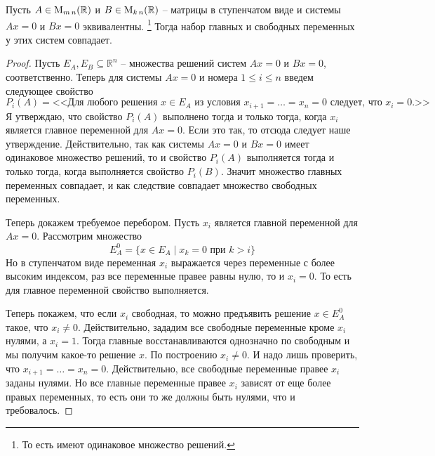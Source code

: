 \begin{claim}
Пусть $A\in\operatorname{M}_{m\,n}(\mathbb R)$ и $B\in\operatorname{M}_{k\,n}(\mathbb R)$ -- матрицы в ступенчатом виде и системы $Ax = 0$ и $Bx = 0$ эквивалентны.%
\footnote{То есть имеют одинаковое множество решений.}
Тогда набор главных и свободных переменных у этих систем совпадает.
\end{claim}
\begin{proof}

Пусть $E_A, E_B\subseteq \mathbb R^n$ -- множества решений систем $Ax = 0$ и $Bx = 0$, соответственно.
Теперь для системы $Ax = 0$ и номера $1\leqslant i \leqslant n$ введем следующее свойство 
\[
P_i(A) = \text{<<Для любого решения $x\in E_A$ из условия $x_{i+1} = \ldots = x_n = 0$ следует, что $x_i = 0$.>>}
\]
Я утверждаю, что свойство $P_i(A)$ выполнено тогда и только тогда, когда $x_i$ является главное переменной для $Ax = 0$.
Если это так, то отсюда следует наше утверждение.
Действительно, так как системы $Ax = 0$ и $Bx = 0$ имеет одинаковое множество решений, то и свойство $P_i(A)$ выполняется тогда и только тогда, когда выполняется свойство $P_i(B)$.
Значит множество главных переменных совпадает, и как следствие совпадает множество свободных переменных.

Теперь докажем требуемое перебором.
Пусть $x_i$ является главной переменной для $Ax = 0$.
Рассмотрим множество
\[
E_A^0 = \{x\in E_A\mid x_k = 0\text{ при }k>i\}
\]
Но в ступенчатом виде переменная $x_i$ выражается через переменные с более высоким индексом, раз все переменные правее равны нулю, то и $x_i = 0$.
То есть для главное переменной свойство выполняется.

Теперь покажем, что если $x_i$ свободная, то можно предъявить решение $x\in E_A^0$ такое, что $ x_i \neq 0$.
Действительно, зададим все свободные переменные кроме $x_i$ нулями, а $x_i = 1$.
Тогда главные восстанавливаются однозначно по свободным и мы получим какое-то решение $x$.
По построению $x_i\neq 0$.
И надо лишь проверить, что $x_{i+1} = \ldots = x_n = 0$.
Действительно, все свободные переменные правее $x_i$ заданы нулями.
Но все главные переменные правее $x_i$ зависят от еще более правых переменных, то есть они то же должны быть нулями, что и требовалось.
\end{proof}


